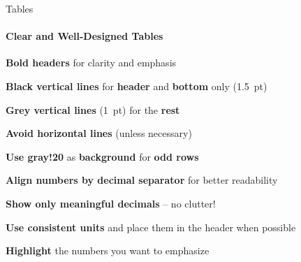 \documentclass[aspectratio=169]{beamer}
\begin{document}
\begin{frame}{Tables}
    \framesubtitle{Clear and Well-Designed Tables}

    \vspace{-0.7cm}
    \begin{minipage}[t]{0.49\textwidth}
        \begin{coloredblock}
            \vspace{0.2cm}
            \begin{tugitemize}
                \item \footnotesize \textbf{Bold headers} for clarity and emphasis
                \item \textbf{Black vertical lines} for \textbf{header} and \textbf{bottom} only (1.5~pt) 
                \item \textbf{Grey vertical lines} (1~pt) for the \textbf{rest}
                \item \footnotesize \textbf{Avoid horizontal lines} (unless necessary)
                \item \footnotesize \textbf{Use gray!20} as \textbf{background} for \textbf{odd rows}
            \end{tugitemize}
        \end{coloredblock}
        \begin{coloredblock}
            \vspace{0.2cm}
            \begin{tugitemize}
                \item \footnotesize \textbf{Align numbers by decimal separator} for better readability
                \item \footnotesize \textbf{Show only meaningful decimals} – no clutter!
                \item \footnotesize \textbf{Use consistent units} and place them in the header when possible
                \item \footnotesize \textbf{Highlight} the numbers you want to emphasize
            \end{tugitemize}
        \end{coloredblock}
    \end{minipage}
    \hfill
    \begin{minipage}[t]{0.49\textwidth}
        \vspace{2cm}
        \begin{table}[htbp]

\end{table}
\end{minipage}
\end{frame}
\end{document}
